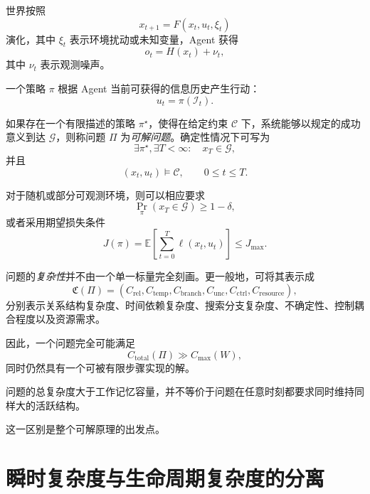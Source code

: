 世界按照
\begin{equation}
x_{t+1}
=
F(x_t,u_t,\xi_t)
\label{eq:world-dynamics}
\end{equation}
演化，其中 $\xi_t$ 表示环境扰动或未知变量，Agent 获得
\begin{equation}
o_t
=
H(x_t)+\nu_t,
\end{equation}
其中 $\nu_t$ 表示观测噪声。

一个策略 $\pi$ 根据 Agent 当前可获得的信息历史产生行动：
\begin{equation}
u_t
=
\pi(\mathcal I_t).
\end{equation}

如果存在一个有限描述的策略 $\pi^\star$，使得在给定约束 $\mathcal C$ 下，系统能够以规定的成功意义到达 $\mathcal G$，则称问题 $\Pi$ 为\emph{可解问题}。确定性情况下可写为
\begin{equation}
\exists \pi^\star,\exists T<\infty:
\quad
x_T\in\mathcal G,
\end{equation}
并且
\begin{equation}
(x_t,u_t)\models\mathcal C,
\qquad
0\leq t\leq T.
\end{equation}

对于随机或部分可观测环境，则可以相应要求
\begin{equation}
\Pr_\pi(x_T\in\mathcal G)
\geq
1-\delta,
\end{equation}
或者采用期望损失条件
\begin{equation}
J(\pi)
=
\mathbb E
\left[
\sum_{t=0}^{T}
\ell(x_t,u_t)
\right]
\leq
J_{\max}.
\end{equation}

问题的\emph{复杂性}并不由一个单一标量完全刻画。更一般地，可将其表示成
\begin{equation}
\mathfrak C(\Pi)
=
\left(
C_{\mathrm{rel}},
C_{\mathrm{temp}},
C_{\mathrm{branch}},
C_{\mathrm{unc}},
C_{\mathrm{ctrl}},
C_{\mathrm{resource}}
\right),
\end{equation}
分别表示关系结构复杂度、时间依赖复杂度、搜索分支复杂度、不确定性、控制耦合程度以及资源需求。

因此，一个问题完全可能满足
\begin{equation}
C_{\mathrm{total}}(\Pi)
\gg
C_{\max}(W),
\end{equation}
同时仍然具有一个可被有限步骤实现的解。

问题的总复杂度大于工作记忆容量，并不等价于问题在任意时刻都要求同时维持同样大的活跃结构。

这一区别是整个可解原理的出发点。

\section{瞬时复杂度与生命周期复杂度的分离}

